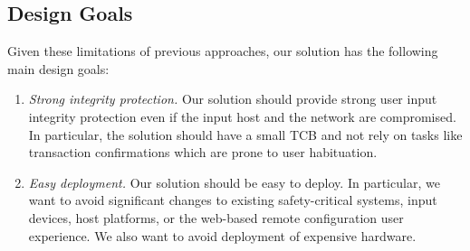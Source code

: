 \subsection{Design Goals}

Given these limitations of previous approaches, our solution has the following main design goals: 

\begin{enumerate}
    \item \emph{Strong integrity protection.} Our solution should provide strong user input integrity protection even if the input host and the network are compromised. In particular, the solution should have a small TCB and not rely on tasks like transaction confirmations which are prone to user habituation. 

    \item \emph{Easy deployment.} Our solution should be easy to deploy. In particular, we want to avoid significant changes to existing safety-critical systems, input devices, host platforms, or the web-based remote configuration user experience. We also want to avoid deployment of expensive hardware.
\end{enumerate}




